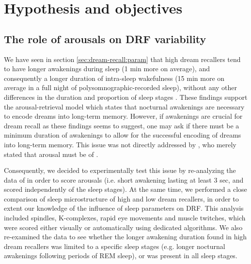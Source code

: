 \cleardoublepage

\chapter{Hypothesis and objectives}
\label{sec:problematic}


\section{The role of arousals on DRF variability}
\label{sec:problematic:arousals}

We have seen in section \ref{sec:dream-recall:param} that high dream recallers tend to have longer awakenings during sleep (1 min more on average), and consequently a longer duration of intra-sleep wakefulness (15 min more on average in a full night of polysomnographic-recorded sleep), without any other differences in the duration and proportion of sleep stages \citep{eichenlaub_brain_2014}. These findings support the arousal-retrieval model which states that nocturnal awakenings are necessary to encode dreams into long-term memory. However, if awakenings are crucial for dream recall as these findings seems to suggest, one may ask if there must be a minimum duration of awakenings to allow for the successful encoding of dreams into long-term memory. This issue was not directly addressed by \citet{koulack_dream_1976}, who merely stated that arousal must be of .

Consequently, we decided to experimentally test this issue by re-analyzing the data of \citet{eichenlaub_brain_2014} in order to score arousals (i.e. short awakening lasting at least 3 sec, and scored independently of the sleep stages). At the same time, we performed a close comparison of sleep microstructure of high and low dream recallers, in order to extent our knowledge of the influence of sleep parameters on DRF. This analysis included spindles, K-complexes, rapid eye movements and muscle twitches, which were scored either visually or automatically using dedicated algorithms. We also re-examined the data to see whether the longer awakening duration found in high dream recallers was limited to a specific sleep stages (e.g. longer nocturnal awakenings following periods of REM sleep), or was present in all sleep stages.

